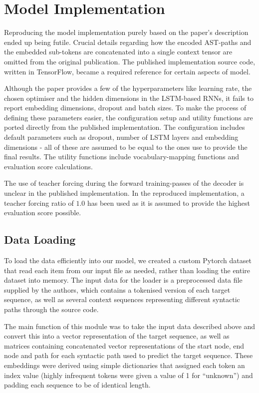 \documentclass{article} %
\begin{document}
\section{Model Implementation} \label{sec:implementation}
Reproducing the model implementation purely based on the paper's description ended up being futile. Crucial details regarding how the encoded AST-paths and the embedded sub-tokens are concatenated into a single context tensor are omitted from the original publication. The published implementation source code, written in TensorFlow, became a required reference for certain aspects of model. 

Although the paper provides a few of the hyperparameters like learning rate, the chosen optimiser and the hidden dimensions in the LSTM-based RNNs, it fails to report embedding dimensions, dropout and batch sizes. To make the process of defining these parameters easier, the configuration setup and utility functions are ported directly from the published implementation. The configuration includes default parameters such as dropout, number of LSTM layers and embedding dimensions - all of these are assumed to be equal to the ones use to provide the final results. The utility functions include vocabulary-mapping functions and evaluation score calculations.

The use of teacher forcing during the forward training-passes of the decoder is unclear in the published implementation. In the reproduced implementation, a teacher forcing ratio of $1.0$ has been used as it is assumed to provide the highest evaluation score possible. 

\subsection{Data Loading}
To load the data efficiently into our model, we created a custom Pytorch dataset that read each item from our input file as needed, rather than loading the entire dataset into memory.
%
The input data for the loader is a preprocessed data file supplied by the authors, which contains a tokenised version of each target sequence, as well as several context sequences representing different syntactic paths through the source code. 

The main function of this module was to take the input data described above and convert this into a vector representation of the target sequence, as well as matrices containing concatenated vector representations of the start node, end node and path for each syntactic path used to predict the target sequence. These embeddings were derived using simple dictionaries that assigned each token an index value (highly infrequent tokens were given a value of 1 for “unknown”) and padding each sequence to be of identical length.
%
\end{document}
